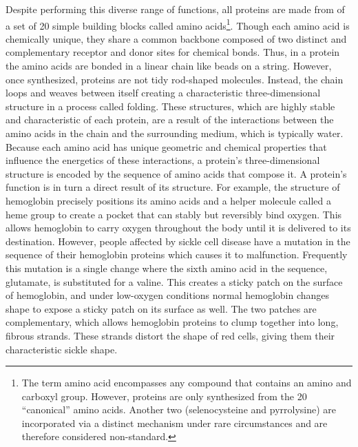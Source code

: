 Despite performing this diverse range of functions, all proteins are made from of a set of 20 simple building blocks called amino acids\footnote{The term amino acid encompasses any compound that contains an amino and carboxyl group. However, proteins are only synthesized from the 20 ``canonical'' amino acids. Another two (selenocysteine and pyrrolysine) are incorporated via a distinct mechanism under rare circumstances and are therefore considered non-standard.}. Though each amino acid is chemically unique, they share a common backbone composed of two distinct and complementary receptor and donor sites for chemical bonds. Thus, in a protein the amino acids are bonded in a linear chain like beads on a string. However, once synthesized, proteins are not tidy rod-shaped molecules. Instead, the chain loops and weaves between itself creating a characteristic three-dimensional structure in a process called folding. These structures, which are highly stable and characteristic of each protein, are a result of the interactions between the amino acids in the chain and the surrounding medium, which is typically water. Because each amino acid has unique geometric and chemical properties that influence the energetics of these interactions, a protein's three-dimensional structure is encoded by the sequence of amino acids that compose it. A protein's function is in turn a direct result of its structure. For example, the structure of hemoglobin precisely positions its amino acids and a helper molecule called a heme group to create a pocket that can stably but reversibly bind oxygen. This allows hemoglobin to carry oxygen throughout the body until it is delivered to its destination. However, people affected by sickle cell disease have a mutation in the sequence of their hemoglobin proteins which causes it to malfunction. Frequently this mutation is a single change where the sixth amino acid in the sequence, glutamate, is substituted for a valine. This creates a sticky patch on the surface of hemoglobin, and under low-oxygen conditions normal hemoglobin changes shape to expose a sticky patch on its surface as well. The two patches are complementary, which allows hemoglobin proteins to clump together into long, fibrous strands. These strands distort the shape of red cells, giving them their characteristic sickle shape.

